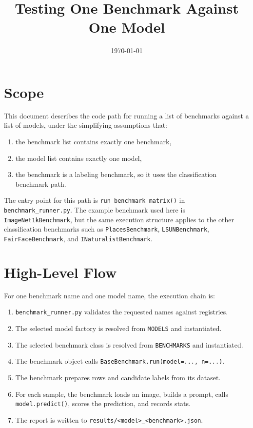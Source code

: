 \documentclass[11pt]{article}
\title{Testing One Benchmark Against One Model}
\author{}
\date{\today}
\begin{document}
\maketitle

\section{Scope}
This document describes the code path for running a list of benchmarks against a list of models, under the simplifying assumptions that:
\begin{enumerate}[label=\arabic*.]
    \item the benchmark list contains exactly one benchmark,
    \item the model list contains exactly one model,
    \item the benchmark is a labeling benchmark, so it uses the classification benchmark path.
\end{enumerate}

The entry point for this path is \texttt{run\_benchmark\_matrix()} in \texttt{benchmark\_runner.py}. The example benchmark used here is \texttt{ImageNet1kBenchmark}, but the same execution structure applies to the other classification benchmarks such as \texttt{PlacesBenchmark}, \texttt{LSUNBenchmark}, \texttt{FairFaceBenchmark}, and \texttt{INaturalistBenchmark}.

\section{High-Level Flow}
For one benchmark name and one model name, the execution chain is:
\begin{enumerate}[label=\arabic*.]
    \item \texttt{benchmark\_runner.py} validates the requested names against registries.
    \item The selected model factory is resolved from \texttt{MODELS} and instantiated.
    \item The selected benchmark class is resolved from \texttt{BENCHMARKS} and instantiated.
    \item The benchmark object calls \texttt{BaseBenchmark.run(model=..., n=...)}.
    \item The benchmark prepares rows and candidate labels from its dataset.
    \item For each sample, the benchmark loads an image, builds a prompt, calls \texttt{model.predict()}, scores the prediction, and records stats.
    \item The report is written to \texttt{results/<model>\_<benchmark>.json}.
\end{enumerate}
\end{document}
